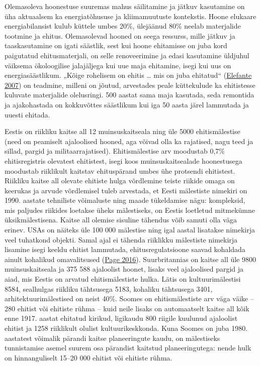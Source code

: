 \documentclass[estonian,]{article}
\begin{document}
Olemasoleva hoonestuse suuremas mahus säilitamine ja jätkuv kasutamine on üha aktuaalsem ka energiatõhususe ja kliimamuutuste kontekstis. Hoone elukaare energiabilansist kulub küttele umbes 20\%, ülejäänud 80\% neelab materjalide tootmine ja ehitus. Olemasolevad hooned on seega ressurss, mille jätkuv ja taaskasutamine on igati säästlik, sest kui hoone ehitamisse on juba kord paigutatud ehitusmaterjali, on selle renoveerimine ja edasi kasutamine üldjuhul väiksema ökoloogilise jalajäljega kui uue maja ehitamine, isegi kui uus on energiasäästlikum. „Kõige rohelisem on ehitis \ldots{} mis on juba ehitatud`` (\protect\hyperlink{Elefante2007}{Elefante 2007}) on teadmine, milleni on jõutud, arvestades peale küttekulude ka ehitistesse kuluvate materjalide olelusringi. 500 aastat sama maja kasutada, seda remontida ja ajakohastada on kokkuvõttes säästlikum kui iga 50 aasta järel lammutada ja uuesti ehitada.

Eestis on riikliku kaitse all 12 muinsuskaitseala ning üle 5000 ehitismälestise (need on peamiselt ajaloolised hooned, aga võivad olla ka rajatised, nagu teed ja sillad, pargid ja militaarrajatised). Ehitismälestise arv moodustab 0,7\% ehitisregistris olevatest ehitistest, isegi koos muinsuskaitsealade hoonestusega moodustab riiklikult kaitstav ehituspärand umbes ühe protsendi ehitistest. Riikliku kaitse all olevate ehitiste hulga võrdlemine teiste riikide omaga on keerukas ja arvude võrdlemisel tuleb arvestada, et Eesti mälestiste nimekiri on 1990. aastate tehniliste võimaluste ning maade tükeldamise nägu: kompleksid, mis paljudes riikides loetakse üheks mälestiseks, on Eestis loetletud mitmekümne üksikmälestisena. Kaitse all olemise sisuline tähendus võib samuti olla väga erinev. USAs on näiteks üle 100 000 mälestise ning igal aastal lisatakse nimekirja veel tuhatkond objekti. Samal ajal ei tähenda riiklikku mälestiste nimekirja lisamine isegi keeldu ehitist lammutada, ehitusregulatsioone saavad kohaldada ainult kohalikud omavalitsused (\protect\hyperlink{Page2016}{Page 2016}). Suurbritannias on kaitse all üle 9800 muinsuskaitseala ja 375 588 ajaloolist hoonet, lisaks veel ajaloolised pargid ja aiad, mis Eestis on arvatud ehitismälestiste hulka. Lätis on kultuurimälestisi 8584, sealhulgas riikliku tähtsusega 5183, kohaliku tähtsusega 3401, arhitektuurimälestised on neist 40\%. Soomes on ehitismälestiste arv väga väike -- 280 ehitist või ehitiste rühma -- kuid neile lisaks on automaatselt kaitse all kõik enne 1917. aastat ehitatud kirikud, ligikaudu 800 riigile kuulunud ajaloolist ehitist ja 1258 riiklikult olulist kultuurikeskkonda. Kuna Soomes on juba 1980. aastatest võimalik pärandi kaitse planeeringute kaudu, on mälestiseks tunnistamise asemel suurem osa pärandist kaitstud planeeringutega: nende hulk on hinnanguliselt 15--20 000 ehitist või ehitiste rühma.
\end{document}

